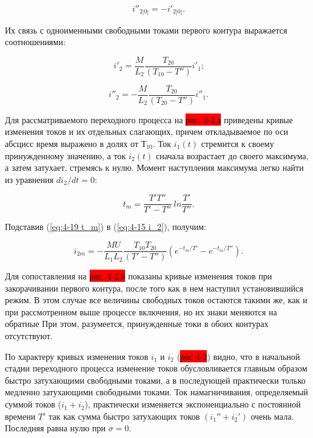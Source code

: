 \begin{equation}
    \label{eq:4-16 i''}
    i''_{2|0|}=-i'_{2|0|}\text{.}
\end{equation}

Их связь с одноименными свободными токами первого контура выражается соотношениями:

\begin{equation}
    \label{eq:4-17 i'2}
    i'_2=\frac{M}{L_2}\frac{T_{20}}{(T_{10}-T'')}i'_1\text{;}
\end{equation}

\begin{equation}
    \label{eq:4-18 i''2}
    i''_2=-\frac{M}{L_2}\frac{T_{20}}{(T_{20}-T'')}i''_1\text{.}
\end{equation}

Для рассматриваемого переходного процесса на \colorbox{red}{рис. 4-2,а} приведены кривые изменения токов и их отдельных слагающих, причем откладываемое по оси абсцисс время выражено в долях от $ Т_{10} $. Ток $ i_1(t) $ стремится к своему принужденному значению, а ток $ i_2(t) $ сначала возрастает до своего максимума, а затем затухает, стремясь к нулю. Момент наступления максимума легко найти из уравнения $ di_2 / dt = 0 $:

\begin{equation}
    \label{eq:4-19 t_m}
    t_m=\frac{T'T''}{T'-T''}~ln\frac{T'}{T''}\text{.}
\end{equation}

Подставив (\ref{eq:4-19 t_m}) в (\ref{eq:4-15 i_2}), получим:

\begin{equation}
    \label{eq:4-20 i2}
    i_{2m}=-\frac{MU}{L_1L_2}\frac{T_{10}T_{20}}{(T'-T'')}(e^{-t_m/T'}-e^{-t_m/T''})\text{.}
\end{equation}

Для сопоставления на \colorbox{red}{рис. 4-2,6} показаны кривые изменения токов при закорачивании первого контура, после того как в нем наступил установившийся режим. В этом случае все величины свободных токов остаются такими же, как и при рассмотренном выше процессе включения, но их знаки меняются на обратные При этом, разумеется, принужденные токи в обоих контурах отсутствуют.

По характеру кривых изменения токов $ i_1 $ и $ i_2 $ (\colorbox{red}{рис 4-2}) видно, что в начальной стадии переходного процесса изменение токов обусловливается главным образом быстро затухающими свободными токами, а в последующей практически только медленно затухающими свободными токами. Ток намагничивания, определяемый суммой токов ($ i_1 + i_2 $), практически изменяется экспоненциально с постоянной времени $ T' $ так как сумма быстро затухающих токов $ (i_1''+i_2') $ очень мала. Последняя равна нулю при $ \sigma = 0 $.

